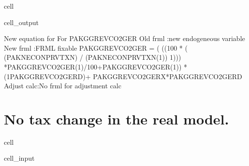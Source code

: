 \documentclass[letterpaper,10pt,english]{jupyterBook}
\begin{document}
\begin{sphinxuseclass}{cell}
\begin{sphinxVerbatimOutput}
\begin{sphinxuseclass}{cell_output}
\begin{sphinxVerbatim}[commandchars=\\\{\}]
New equation for For PAKGGREVCO2GER
Old frml   :new endogeneous variable 
New frml   :FRML \PYGZlt{}fixable\PYGZgt{} PAKGGREVCO2GER = ( ((100 * ( (PAKNECONPRVTXN) / (PAKNECONPRVTXN(\PYGZhy{}1)) \PYGZhy{}1))) *PAKGGREVCO2GER(\PYGZhy{}1)/100+PAKGGREVCO2GER(\PYGZhy{}1)) * (1\PYGZhy{}PAKGGREVCO2GER\PYGZus{}D)+ PAKGGREVCO2GER\PYGZus{}X*PAKGGREVCO2GER\PYGZus{}D \PYGZdl{}
Adjust calc:No frml for adjustment calc  
\end{sphinxVerbatim}

\end{sphinxuseclass}\end{sphinxVerbatimOutput}

\end{sphinxuseclass}

\section{No tax change in the real model.}
\label{\detokenize{content/howto/modifymodel/create_real_model:no-tax-change-in-the-real-model}}
\begin{sphinxuseclass}{cell}\begin{sphinxVerbatimInput}

\begin{sphinxuseclass}{cell_input}
\begin{sphinxVerbatim}[commandchars=\\\{\}]
  

  
\end{sphinxVerbatim}

\end{sphinxuseclass}\end{sphinxVerbatimInput}

\end{sphinxuseclass}
\end{document}
